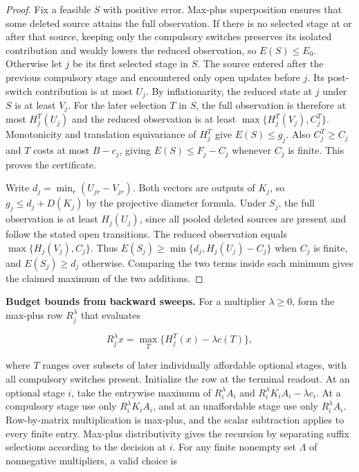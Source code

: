 \documentclass[11pt,letterpaper]{article}
\begin{document}
\begin{proof}
Fix a feasible $S$ with positive error. Max-plus superposition ensures that some deleted source attains the full observation. If there is no selected stage at or after that source, keeping only the compulsory switches preserves its isolated contribution and weakly lowers the reduced observation, so $E(S)\le E_0$. Otherwise let $j$ be its first selected stage in $S$. The source entered after the previous compulsory stage and encountered only open updates before $j$. Its post-switch contribution is at most $U_j$. By inflationarity, the reduced state at $j$ under $S$ is at least $V_j$. For the later selection $T$ in $S$, the full observation is therefore at most $H_j^T(U_j)$ and the reduced observation is at least $\max\{H_j^T(V_j),C_j^T\}$. Monotonicity and translation equivariance of $H_j^T$ give $E(S)\le g_j$. Also $C_j^T\ge C_j$ and $T$ costs at most $B-c_j$, giving $E(S)\le F_j-C_j$ whenever $C_j$ is finite. This proves the certificate.

Write $d_j=\min_r(U_{jr}-V_{jr})$. Both vectors are outputs of $K_j$, so $g_j\le d_j+D(K_j)$ by the projective diameter formula. Under $S_j$, the full observation is at least $H_j(U_j)$, since all pooled deleted sources are present and follow the stated open transitions. The reduced observation equals $\max\{H_j(V_j),C_j\}$. Thus $E(S_j)\ge\min\{d_j,H_j(U_j)-C_j\}$ when $C_j$ is finite, and $E(S_j)\ge d_j$ otherwise. Comparing the two terms inside each minimum gives the claimed maximum of the two additions.
\end{proof}

\noindent\textbf{Budget bounds from backward sweeps.} For a multiplier $\lambda\ge0$, form the max-plus row $R_j^\lambda$ that evaluates

\[
R_j^\lambda x=\max_T\{ H_j^T(x)-\lambda c(T)\},
\]

where $T$ ranges over subsets of later individually affordable optional stages, with all compulsory switches present. Initialize the row at the terminal readout. At an optional stage $i$, take the entrywise maximum of $R_i^\lambda A_i$ and $R_i^\lambda K_i A_i-\lambda c_i$. At a compulsory stage use only $R_i^\lambda K_i A_i$, and at an unaffordable stage use only $R_i^\lambda A_i$. Row-by-matrix multiplication is max-plus, and the scalar subtraction applies to every finite entry. Max-plus distributivity gives the recursion by separating suffix selections according to the decision at $i$. For any finite nonempty set $\Lambda$ of nonnegative multipliers, a valid choice is
\end{document}
